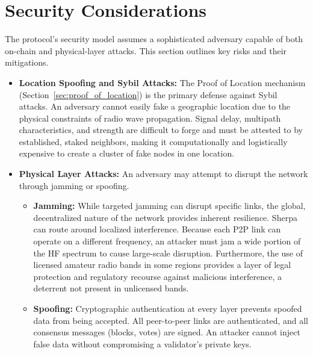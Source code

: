 \documentclass{article}
\begin{document}
\section{Security Considerations}
\label{sec:security}

The protocol's security model assumes a sophisticated adversary capable of both on-chain and physical-layer attacks. This section outlines key risks and their mitigations.

\begin{itemize}
    \item \textbf{Location Spoofing and Sybil Attacks:} The Proof of Location mechanism (Section~\ref{sec:proof_of_location}) is the primary defense against Sybil attacks. An adversary cannot easily fake a geographic location due to the physical constraints of radio wave propagation. Signal delay, multipath characteristics, and strength are difficult to forge and must be attested to by established, staked neighbors, making it computationally and logistically expensive to create a cluster of fake nodes in one location.

    \item \textbf{Physical Layer Attacks:} An adversary may attempt to disrupt the network through jamming or spoofing.
        \begin{itemize}
            \item \textbf{Jamming:} While targeted jamming can disrupt specific links, the global, decentralized nature of the network provides inherent resilience. Sherpa can route around localized interference. Because each P2P link can operate on a different frequency, an attacker must jam a wide portion of the HF spectrum to cause large-scale disruption. Furthermore, the use of licensed amateur radio bands in some regions provides a layer of legal protection and regulatory recourse against malicious interference, a deterrent not present in unlicensed bands.
            \item \textbf{Spoofing:} Cryptographic authentication at every layer prevents spoofed data from being accepted. All peer-to-peer links are authenticated, and all consensus messages (blocks, votes) are signed. An attacker cannot inject false data without compromising a validator's private keys.
        \end{itemize}


\end{itemize}
\end{document}

